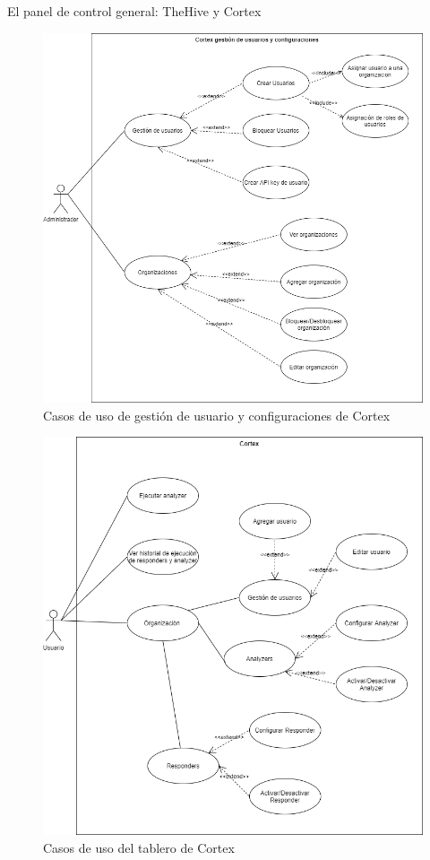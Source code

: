 \begin{section}{El panel de control general: TheHive y Cortex}
\begin{figure}[H]
        \includegraphics[width=1\textwidth]{./iteracion_1_imagenes/figura_30_cortex_user_conf.png}
        \caption{Casos de uso de gestión de usuario y configuraciones de Cortex}
        \label{fig:caso_de_uso_gestion_usuarios_configuraciones_cortex}
     \end{figure}
     \begin{figure}[H]
      \centering
      \includegraphics[width=1\textwidth]{./iteracion_1_imagenes/figura_31_cortex_tablero.png}
        \caption{Casos de uso del tablero de Cortex}
        \label{fig:caso_de_uso_tablero_cortex}
     \end{figure}
     
     
   \end{section}

